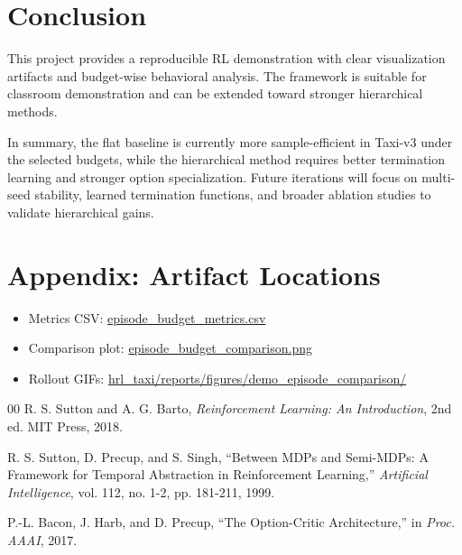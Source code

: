 \documentclass[conference]{IEEEtran}
\begin{document}
\section{Conclusion}
This project provides a reproducible RL demonstration with clear visualization artifacts and budget-wise behavioral analysis. The framework is suitable for classroom demonstration and can be extended toward stronger hierarchical methods.

In summary, the flat baseline is currently more sample-efficient in Taxi-v3 under the selected budgets, while the hierarchical method requires better termination learning and stronger option specialization. Future iterations will focus on multi-seed stability, learned termination functions, and broader ablation studies to validate hierarchical gains.

\section*{Appendix: Artifact Locations}
\begin{itemize}
\item Metrics CSV: \url{episode_budget_metrics.csv}
\item Comparison plot: \url{episode_budget_comparison.png}
\item Rollout GIFs: \url{hrl_taxi/reports/figures/demo_episode_comparison/}
\end{itemize}

\begin{thebibliography}{00}
R. S. Sutton and A. G. Barto, \textit{Reinforcement Learning: An Introduction}, 2nd ed. MIT Press, 2018.

R. S. Sutton, D. Precup, and S. Singh, ``Between MDPs and Semi-MDPs: A Framework for Temporal Abstraction in Reinforcement Learning,'' \textit{Artificial Intelligence}, vol. 112, no. 1-2, pp. 181-211, 1999.

P.-L. Bacon, J. Harb, and D. Precup, ``The Option-Critic Architecture,'' in \textit{Proc. AAAI}, 2017.
\end{thebibliography}
\end{document}
